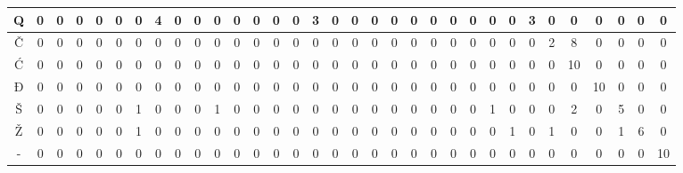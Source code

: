 \begin{table}[]
{\begin{tabular}{c|c|c|c|c|c|c|c|c|c|c|c|c|c|c|c|c|c|c|c|c|c|c|c|c|c|c|c|c|c|c|c|c}
Q & 0 & 0  & 0 & 0 & 0 & 0 & 4 & 0 & 0 & 0  & 0 & 0 & 0 & 0 & 3 & 0  & 0 & 0 & 0  & 0 & 0  & 0 & 0 & 0  & 0 & 3 & 0 & 0  & 0  & 0 & 0 & 0  \\ \hline
Č & 0 & 0  & 0 & 0 & 0 & 0 & 0 & 0 & 0 & 0  & 0 & 0 & 0 & 0 & 0 & 0  & 0 & 0 & 0  & 0 & 0  & 0 & 0 & 0  & 0 & 0 & 2 & 8  & 0  & 0 & 0 & 0  \\ \hline
Ć & 0 & 0  & 0 & 0 & 0 & 0 & 0 & 0 & 0 & 0  & 0 & 0 & 0 & 0 & 0 & 0  & 0 & 0 & 0  & 0 & 0  & 0 & 0 & 0  & 0 & 0 & 0 & 10 & 0  & 0 & 0 & 0  \\ \hline
Đ & 0 & 0  & 0 & 0 & 0 & 0 & 0 & 0 & 0 & 0  & 0 & 0 & 0 & 0 & 0 & 0  & 0 & 0 & 0  & 0 & 0  & 0 & 0 & 0  & 0 & 0 & 0 & 0  & 10 & 0 & 0 & 0  \\ \hline
Š & 0 & 0  & 0 & 0 & 0 & 1 & 0 & 0 & 0 & 1  & 0 & 0 & 0 & 0 & 0 & 0  & 0 & 0 & 0  & 0 & 0  & 0 & 0 & 1  & 0 & 0 & 0 & 2  & 0  & 5 & 0 & 0  \\ \hline
Ž & 0 & 0  & 0 & 0 & 0 & 1 & 0 & 0 & 0 & 0  & 0 & 0 & 0 & 0 & 0 & 0  & 0 & 0 & 0  & 0 & 0  & 0 & 0 & 0  & 1 & 0 & 1 & 0  & 0  & 1 & 6 & 0  \\ \hline
- & 0 & 0  & 0 & 0 & 0 & 0 & 0 & 0 & 0 & 0  & 0 & 0 & 0 & 0 & 0 & 0  & 0 & 0 & 0  & 0 & 0  & 0 & 0 & 0  & 0 & 0 & 0 & 0  & 0  & 0 & 0 & 10 \\ \hline
\end{tabular}
}
\end{table}



